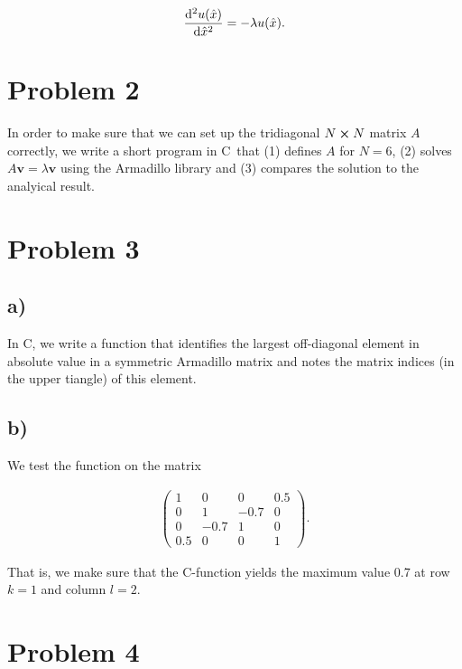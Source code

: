 \documentclass[english,notitlepage,nofootinbib]{revtex4-1}  %
\newcommand{\CC}{C\nolinebreak\hspace{-.05em}\raisebox{.4ex}{\tiny\bf +}\nolinebreak\hspace{-.10em}\raisebox{.4ex}{\tiny\bf +}}
\renewcommand{\vec}{\mathbf}
\begin{document}
\begin{align}\label{p1_scaled_eq}
    \dv[2]{u(\hat{x})}{\hat{x}} = -\lambda u(\hat{x}).
\end{align}

\section*{Problem 2}

In order to make sure that we can set up the tridiagonal $N\cross N$ matrix $A$ correctly, we write a short program in \CC\, that (1) defines $A$ for $N=6$, (2) solves $A\vec{v} = \lambda \vec{v}$ using the Armadillo library and (3) compares the solution to the analyical result.


\section*{Problem 3}

\subsection*{a)}

In \CC, we write a function that identifies the largest off-diagonal element in absolute value in a symmetric Armadillo matrix and notes the matrix indices (in the upper tiangle) of this element.

\subsection*{b)}

We test the function on the matrix

\begin{align*}
    \begin{pmatrix}
        1 & 0 & 0 & 0.5 \\
        0 & 1 & -0.7 & 0 \\
        0 & -0.7 & 1 & 0 \\
        0.5 & 0 & 0 & 1
    \end{pmatrix}.
\end{align*}

That is, we make sure that the \CC-function yields the maximum value 0.7 at row $k=1$ and column $l=2$.

\section*{Problem 4}
\end{document}
